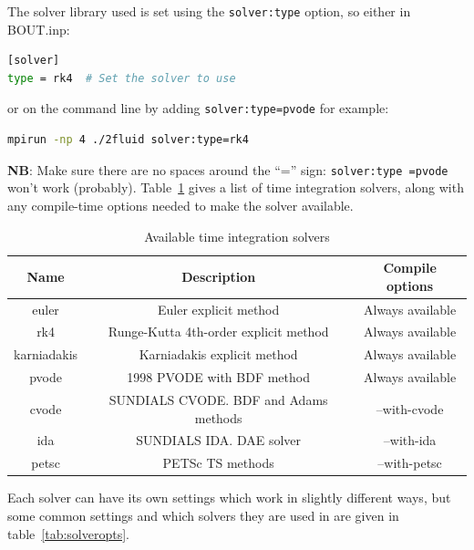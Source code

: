 \documentclass[12pt]{article}
\newcommand{\code}[1]{\texttt{#1}}
\begin{document}
The solver library used is set using the \code{solver:type} option, so either
in BOUT.inp:
%
\begin{lstlisting}[language=bash,numbers=none]
[solver]
type = rk4  # Set the solver to use
\end{lstlisting}
%
or on the command line by adding \code{solver:type=pvode} for example:
%
\begin{lstlisting}[language=bash,numbers=none]
mpirun -np 4 ./2fluid solver:type=rk4
\end{lstlisting}
%
{\bf NB}: Make sure there are no spaces around the ``='' sign:
\code{solver:type =pvode} won't work (probably).  Table~\ref{tab:solvers} gives
a list of time integration solvers, along with any compile-time options needed
to make the solver available.
%
\begin{table}[htb!]
\centering
\caption{Available time integration solvers}
%
\label{tab:solvers}
%
\begin{tabular}{c | c | c}
\hline
Name & Description & Compile options \\
\hline
euler & Euler explicit method & Always available \\
rk4 & Runge-Kutta 4th-order explicit method & Always available \\
karniadakis & Karniadakis explicit method & Always available \\
pvode & 1998 PVODE with BDF method & Always available \\
cvode & SUNDIALS CVODE. BDF and Adams methods & --with-cvode \\
ida & SUNDIALS IDA. DAE solver & --with-ida \\
petsc & PETSc TS methods & --with-petsc \\
\hline
\end{tabular}
%
\end{table}
%
Each solver can have its own settings which work in slightly different ways,
but some common settings and which solvers they are used in are given in
table~\ref{tab:solveropts}.
%
\end{document}
